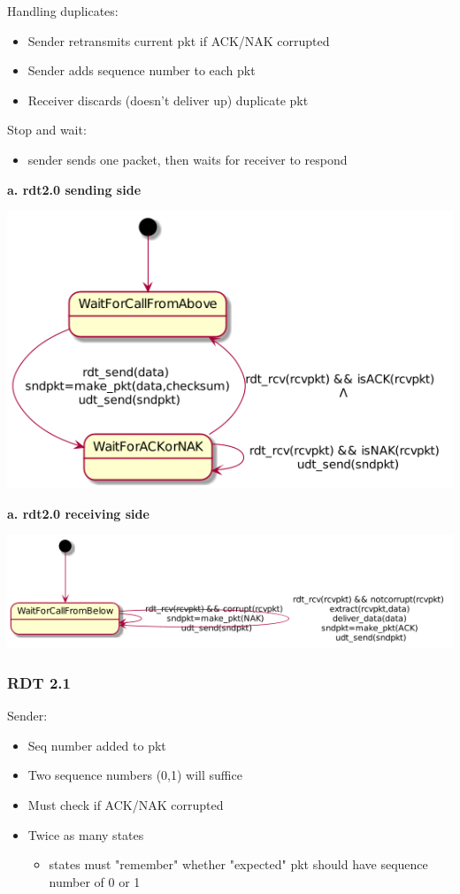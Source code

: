 \documentclass[11pt]{article}
\begin{document}
Handling duplicates:
\begin{itemize}
\item Sender retransmits current pkt if ACK/NAK corrupted
\item Sender adds sequence number to each pkt
\item Receiver discards (doesn't deliver up) duplicate pkt
\end{itemize}

Stop and wait:
\begin{itemize}
\item sender sends one packet, then waits for receiver to respond
\end{itemize}


\textbf{a. rdt2.0 sending side}

\begin{center}
\includegraphics[width=.9\linewidth]{rdt2.0senderFSM.png}
\end{center}

\textbf{a. rdt2.0 receiving side}

\begin{center}
\includegraphics[width=.9\linewidth]{rdt2.0receivingFSM.png}
\end{center}




\subsubsection{RDT 2.1}
\label{sec:org8c2de2f}
Sender:
\begin{itemize}
\item Seq number added to pkt
\item Two sequence numbers (0,1) will suffice
\item Must check if ACK/NAK corrupted
\item Twice as many states
\begin{itemize}
\item states must "remember" whether "expected" pkt should have sequence
number of 0 or 1
\end{itemize}
\end{itemize}
\end{document}
